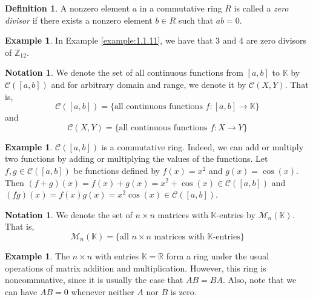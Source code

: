 \documentclass[11pt]{book}
\theoremstyle{definition}\newtheorem{definition}[subsection]{Definition}
\theoremstyle{definition}\newtheorem{example}[subsection]{Example}
\theoremstyle{definition}\newtheorem{notation}[subsection]{Notation}
\theoremstyle{definition}\newtheorem{remark}[subsection]{Remark}
\theoremstyle{theorem}\newtheorem{theorem}[subsection]{Theorem}
\theoremstyle{theorem}\newtheorem{lemma}[subsection]{Lemma}
\theoremstyle{theorem}\newtheorem{proposition}[subsection]{Proposition}
\theoremstyle{theorem}\newtheorem{corollary}[subsection]{Corollary}
\newcommand{\K}{\mathbb{K}}
\newcommand{\CC}{\mathcal{C}}
\newcommand{\R}{\mathbb{R}}
\newcommand{\Z}{\mathbb{Z}}
\newcommand{\M}{\mathcal{M}}
\begin{document}
\begin{definition}\label{definition:1.1.12} 
    A nonzero element $a$ in a commutative ring $R$ is called a \emph{zero divisor} if there exists a nonzero element $b \in R$ such that $ab = 0$.
\end{definition}

\begin{example}\label{example:1.1.13}
    In Example \ref{example:1.1.11}, we have that 3 and 4 are zero divisors of $\Z_{12}$.
\end{example}

\begin{notation}\label{notation:1.1.14} 
    We denote the set of all continuous functions from $[a, b]$ to $\K$ by $\CC([a, b])$ and for arbitrary domain and range, we denote it by $\CC(X, Y)$. That is,
    \begin{equation*}
        \CC([a, b]) = \{\text{all continuous functions $f : [a, b] \to \K$}\}
    \end{equation*}
    and
    \begin{equation*}
        \CC(X, Y) = \{\text{all continuous functions $f : X \to Y$}\}
    \end{equation*}
\end{notation}

\begin{example}\label{example:1.1.15}
    $\CC([a, b])$ is a commutative ring. Indeed, we can add or multiply two functions by adding or multiplying the values of the functions. Let $f, g \in \CC([a, b])$ be functions defined by $f(x) = x^2$ and $g(x) = \cos(x)$. Then $(f + g)(x) = f(x) + g(x) = x^2 + \cos(x) \in \CC([a, b])$ and $(fg)(x) = f(x)g(x) = x^2\cos(x) \in \CC([a, b])$.
\end{example}

\begin{notation}\label{notation:1.1.16}
    We denote the set of $n \times n$ matrices with $\K$-entries by $\M_n(\K)$. That is,
    \begin{equation*}
        \M_n(\K) = \{\text{all $n \times n$ matrices with $\K$-entries}\}
    \end{equation*}
\end{notation}

\begin{example}\label{example:1.1.17}
    The $n \times n$ with entries $\K = \R$ form a ring under the usual operations of matrix addition and multiplication. However, this ring is noncommuative, since it is usually the case that $AB = BA$. Also, note that we can have $AB = 0$ whenever neither $A$ nor $B$ is zero.
\end{example}
\end{document}
